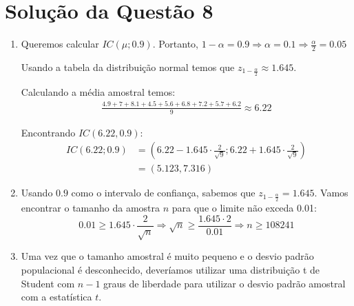 \documentclass[
	12pt,				%
	openright,			%
	oneside,			%
	a4paper,			%
	english,			%
	brazil,				%
	]{abntex2}
\begin{document}
\section{Solução da Questão 8}
\begin{enumerate}[label=\alph*)]
    \item Queremos calcular $IC(\mu;0.9)$. Portanto, $1 - \alpha = 0.9 \Rightarrow \alpha = 0.1 \Rightarrow \frac{\alpha}{2} = 0.05$
    
    Usando a tabela da distribuição normal temos que $z_{1 - \frac{\alpha}{2}} \approx 1.645$.
    
    Calculando a média amostral temos:
    \begin{align*}
        \frac{4.9 + 7 + 8.1 + 4.5 + 5.6 + 6.8 + 7.2 + 5.7 + 6.2}{9} \approx 6.22
    \end{align*}
    
    Encontrando $IC(6.22,0.9)$:
    \begin{align*}
        IC(6.22;0.9) &= \left(6.22 - 1.645\cdot \frac{2}{\sqrt{9}}; 6.22 + 1.645\cdot \frac{2}{\sqrt{9}}\right)\\
        &= \left(5.123, 7.316\right)
    \end{align*}
    \item Usando $0.9$ como o intervalo de confiança, sabemos que $z_{1 - \frac{\alpha}{2}} = 1.645$. Vamos encontrar o tamanho da amostra $n$ para que o limite não exceda 0.01:
    \begin{equation*}
        0.01 \geq 1.645\cdot \frac{2}{\sqrt{n}} \Rightarrow \sqrt{n} \geq \frac{1.645 \cdot 2}{0.01} \Rightarrow n \geq 108241
    \end{equation*}
    
    \item Uma vez que o tamanho amostral é muito pequeno e o desvio padrão populacional é desconhecido, deveríamos utilizar uma distribuição t de Student com $n-1$ graus de liberdade para utilizar o desvio padrão amostral com a estatística $t$.
\end{enumerate}
\end{document}
